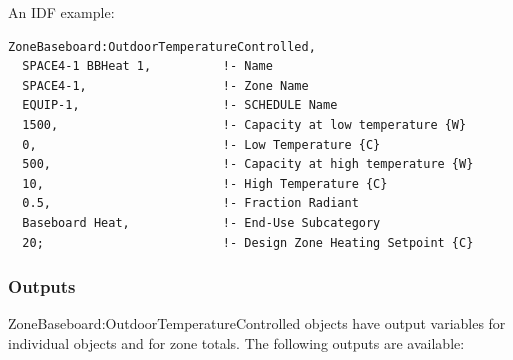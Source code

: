 An IDF example:

\begin{lstlisting}
ZoneBaseboard:OutdoorTemperatureControlled,
  SPACE4-1 BBHeat 1,          !- Name
  SPACE4-1,                   !- Zone Name
  EQUIP-1,                    !- SCHEDULE Name
  1500,                       !- Capacity at low temperature {W}
  0,                          !- Low Temperature {C}
  500,                        !- Capacity at high temperature {W}
  10,                         !- High Temperature {C}
  0.5,                        !- Fraction Radiant
  Baseboard Heat,             !- End-Use Subcategory
  20;                         !- Design Zone Heating Setpoint {C}
\end{lstlisting}

\subsubsection{Outputs}\label{outputs-14-002}

ZoneBaseboard:OutdoorTemperatureControlled objects have output variables for individual objects and for zone totals. The following outputs are available:

